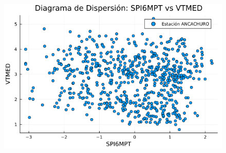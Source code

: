 \begin{figure}[htbp]
\begin{minipage}{0.32\textwidth}
    \includegraphics[width=\linewidth]{Capitulos/Scaterplot/ANCACHURO_SPI6MPT_vs_VTMED.png}
\end{minipage}

\vspace{0.5cm}  %


\end{figure}

